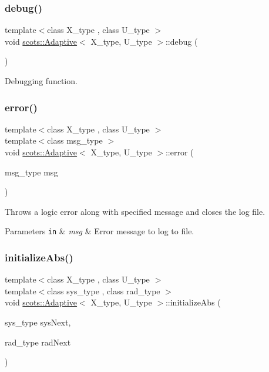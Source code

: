\subsubsection{\texorpdfstring{debug()}{debug()}}
{\footnotesize\ttfamily template$<$class X\+\_\+type , class U\+\_\+type $>$ \\
void \hyperlink{classscots_1_1Adaptive}{scots\+::\+Adaptive}$<$ X\+\_\+type, U\+\_\+type $>$\+::debug (\begin{DoxyParamCaption}{ }\end{DoxyParamCaption})\hspace{0.3cm}{\ttfamily [inline]}}

Debugging function. \mbox{\label{classscots_1_1Adaptive_a550bbb19126456c000595d7e647edb25}} 
\subsubsection{\texorpdfstring{error()}{error()}}
{\footnotesize\ttfamily template$<$class X\+\_\+type , class U\+\_\+type $>$ \\
template$<$class msg\+\_\+type $>$ \\
void \hyperlink{classscots_1_1Adaptive}{scots\+::\+Adaptive}$<$ X\+\_\+type, U\+\_\+type $>$\+::error (\begin{DoxyParamCaption}\item[{msg\+\_\+type}]{msg }\end{DoxyParamCaption})\hspace{0.3cm}{\ttfamily [inline]}}

Throws a logic error along with specified message and closes the log file. 
\begin{DoxyParams}[1]{Parameters}
\mbox{\tt in}  & {\em msg} & Error message to log to file. \\
\hline
\end{DoxyParams}
\mbox{\label{classscots_1_1Adaptive_ae8e0a243c51d3596f994f2b0668892e4}} 
\subsubsection{\texorpdfstring{initialize\+Abs()}{initializeAbs()}}
{\footnotesize\ttfamily template$<$class X\+\_\+type , class U\+\_\+type $>$ \\
template$<$class sys\+\_\+type , class rad\+\_\+type $>$ \\
void \hyperlink{classscots_1_1Adaptive}{scots\+::\+Adaptive}$<$ X\+\_\+type, U\+\_\+type $>$\+::initialize\+Abs (\begin{DoxyParamCaption}\item[{sys\+\_\+type}]{sys\+Next,  }\item[{rad\+\_\+type}]{rad\+Next }\end{DoxyParamCaption})\hspace{0.3cm}{\ttfamily [inline]}}

